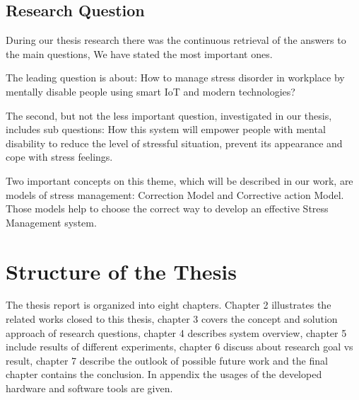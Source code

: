 \subsection{Research Question}
During our thesis research there was the continuous retrieval of the answers to the main questions, We have stated the most important ones.

The leading question is about: How to manage stress disorder in workplace by mentally disable people using smart \ac{IoT} and modern technologies?

The second, but not the less important question, investigated in our thesis, includes sub questions: How this system will empower people with mental disability to reduce the level of stressful situation, prevent its appearance and cope with stress feelings.

Two  important  concepts  on  this  theme,  which  will  be  described  in  our  work,  are  models  of stress management: Correction Model and Corrective action Model. Those models help to choose the correct way to develop an effective Stress Management system.

\section{Structure of the Thesis}
The thesis report is organized into eight chapters. Chapter 2 illustrates the related works closed to this thesis, chapter 3 covers the concept and solution approach of research questions, chapter 4 describes system overview, chapter 5 include results of different experiments, chapter 6 discuss about research goal vs result, chapter 7 describe the outlook of possible future work and the final chapter contains the conclusion. In appendix the usages of the developed hardware and software tools are given.
